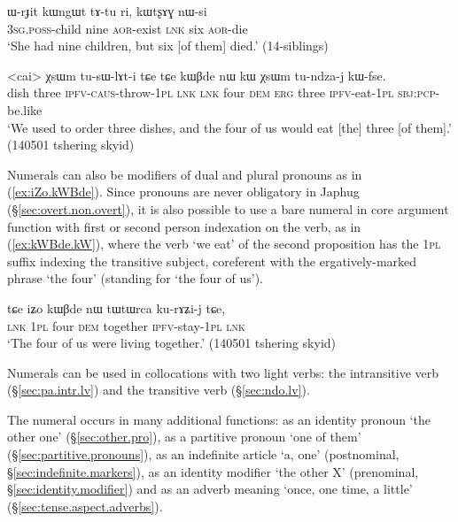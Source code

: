 \begin{exe}
\ex \label{ex:WrJit.kWngWt} 
\gll ɯ-rɟit kɯngɯt tɤ-tu ri, kɯtʂɤɣ nɯ-si \\
\textsc{3sg}.\textsc{poss}-child nine \textsc{aor}-exist \textsc{lnk} six \textsc{aor}-die \\
\glt `She had nine children, but six [of them] died.' (14-siblings) 
\end{exe}

\begin{exe}
\ex \label{ex:kWBde.kW} 
\gll <cai> χsɯm tu-sɯ-lɤt-i tɕe tɕe  kɯβde nɯ kɯ χsɯm tu-ndza-j kɯ-fse. \\
dish three \textsc{ipfv}-\textsc{caus}-throw-\textsc{1pl} \textsc{lnk} \textsc{lnk} four \textsc{dem} \textsc{erg} three \textsc{ipfv}-eat-\textsc{1pl} \textsc{sbj}:\textsc{pcp}-be.like \\
\glt `We used to order three dishes, and the four of us would eat [the] three [of them].' (140501 tshering skyid)
\end{exe}		

Numerals can also be modifiers of dual and plural pronouns as in (\ref{ex:iZo.kWBde}). Since pronouns are never obligatory in Japhug (§\ref{sec:overt.non.overt}), it is also possible to use a bare numeral in core argument function with first or second person indexation on the verb, as in (\ref{ex:kWBde.kW}), where the verb  `we eat' of the second proposition has the \textsc{1pl}  suffix indexing the transitive subject, coreferent with the ergatively-marked phrase  `the four' (standing for  `the four of us').

\largerpage
\begin{exe}
\ex \label{ex:iZo.kWBde} 
\gll tɕe iʑo kɯβde nɯ tɯtɯrca ku-rɤʑi-j tɕe, \\
\textsc{lnk} \textsc{1pl} four \textsc{dem}  together \textsc{ipfv}-stay-\textsc{1pl} \textsc{lnk} \\
\glt `The four of us were living together.' (140501 tshering skyid) 
\end{exe}		

Numerals can be used in collocations with two light verbs: the intransitive verb   (§\ref{sec:pa.intr.lv}) and the transitive verb  (§\ref{sec:ndo.lv}).
 
The numeral  occurs in many additional functions: as an identity pronoun `the other one' (§\ref{sec:other.pro}), as a partitive pronoun `one of them' (§\ref{sec:partitive.pronouns}), as an indefinite article `a, one' (postnominal, §\ref{sec:indefinite.markers}), as an identity modifier `the other X' (prenominal, §\ref{sec:identity.modifier}) and  as an adverb meaning `once, one time, a little' (§\ref{sec:tense.aspect.adverbs}).
 

